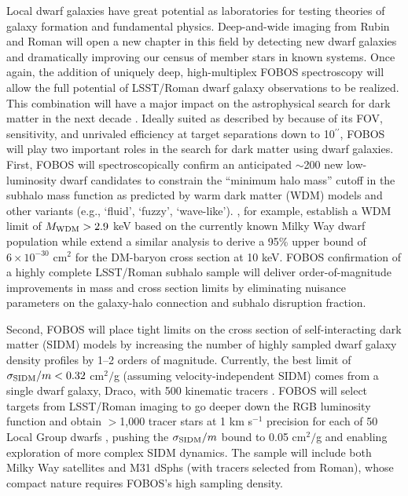 \documentclass[oneside,11pt]{amsart}
\newcommand{\arcsec}{\mbox{$^{\prime\prime}$}}
\begin{document}
Local dwarf galaxies have great potential as laboratories for testing theories of galaxy formation and fundamental physics.  Deep-and-wide imaging from Rubin and Roman will open a new chapter in this field by detecting new dwarf galaxies and dramatically improving our census of member stars in known systems.  Once again, the addition of uniquely deep, high-multiplex FOBOS spectroscopy will allow the full potential of LSST/Roman dwarf galaxy observations to be realized.  This combination will have a major impact on the astrophysical search for dark matter in the next decade \citep{drlica-wagner19}.  Ideally suited as described by \citet{simon19} because of its FOV, sensitivity, and unrivaled efficiency at target separations down to 10\arcsec, FOBOS will play two important roles in the search for dark matter using dwarf galaxies.  First, FOBOS will spectroscopically confirm an anticipated $\sim$200 new low-luminosity dwarf candidates to constrain the ``minimum halo mass'' cutoff in the subhalo mass function as predicted by warm dark matter (WDM) models and other variants (e.g., `fluid', `fuzzy', `wave-like').  \citet{jethwa18}, for example, establish a WDM limit of $M_{\rm WDM} > 2.9$ keV based on the currently known Milky Way dwarf population while \citet{nadler19} extend a similar analysis to derive a 95\% upper bound of $6 \times 10^{-30}$ cm$^2$ for the DM-baryon cross section at 10 keV.  FOBOS confirmation of a highly complete LSST/Roman subhalo sample will deliver order-of-magnitude improvements in mass and cross section limits by eliminating nuisance parameters on the galaxy-halo connection and subhalo disruption fraction.

Second, FOBOS will place tight limits on the cross section of self-interacting dark matter (SIDM) models by increasing the number of highly sampled dwarf galaxy density profiles by 1--2 orders of magnitude.  Currently, the best limit of $\sigma_{\rm SIDM}/m < 0.32$ cm$^2/$g (assuming velocity-independent SIDM) comes from a single dwarf galaxy, Draco, with 500 kinematic tracers \citep{read18}.  FOBOS will select targets from LSST/Roman imaging to go deeper down the RGB luminosity function and obtain $>$1,000 tracer stars at 1 km s$^{-1}$ precision for each of 50 Local Group dwarfs \citep[see][]{drlica-wagner19}, pushing the $\sigma_{\rm SIDM}/m$ bound to 0.05 cm$^2/$g and enabling exploration of more complex SIDM dynamics.  The sample will include both Milky Way satellites and M31 dSphs (with tracers selected from Roman), whose compact nature requires FOBOS's high sampling density.   
\end{document}
